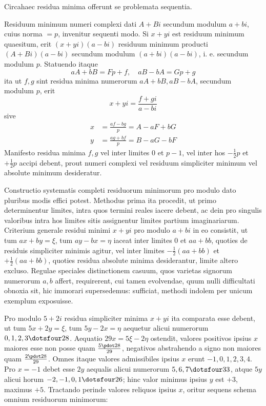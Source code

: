 Circa\textperiodcentered haec residua minima offerunt se problemata sequentia.

Residuum minimum numeri complexi dati $A+Bi$ secundum modulum $a+bi$, cuius norma $=p$, invenitur sequenti modo. Si $x+yi$ est residuum minimum quaesitum, erit $(x+yi)(a-bi)$ residuum minimum producti $(A+Bi)(a-bi)$ secundum modulum $(a+bi)(a-bi)$, i. e. secundum modulum $p$. Statuendo itaque
\[
aA+bB=Fp+f,\quad aB-bA=Gp+g
\]
ita ut $f,g$ sint residua minima numerorum $aA+bB,aB-bA$, secundum modulum $p$, erit
%
\[
x+yi=\frac{f+gi}{a-bi}
\]
sive
\[
\begin{aligned}
x&=\frac{af-bg}{p}=A-aF+bG\\
y&=\frac{ag+bf}{p}=B-aG-bF
\end{aligned}
\]
Manifesto residua minima $f,g$ vel inter limites $0$ et $p-1$, vel inter hos $-\frac12p$ et $+\frac12p$ accipi debent, prout numeri complexi vel residuum simpliciter minimum vel absolute minimum desideratur.

Constructio systematis completi residuorum minimorum pro modulo dato pluribus modis effici potest. Methodus prima ita procedit, ut primo determinentur limites, intra quos termini reales iacere debent, ac dein pro singulis valoribus intra hos limites sitis assignentur limites partium imaginariarum. Criterium generale residui minimi $x+yi$ pro modulo $a+bi$ in eo consistit, ut tum $ax+by=\xi$, tum $ay-bx=\eta$ iaceat inter limites $0$ et $aa+bb$, quoties de residuis simpliciter minimis agitur, vel inter limites $-\frac12(aa+bb)$ et $+\frac12(aa+bb)$, quoties residua absolute minima desiderantur, limite altero excluso. Regulae speciales distinctionem casuum, quos varietas signorum numerorum $a,b$ affert, requirerent, cui tamen evolvendae, quum nulli difficultati obnoxia sit, hic immorari supersedemus: sufficiat, methodi indolem per unicum exemplum exposuisse.

Pro modulo $5+2i$ residua simpliciter minima $x+yi$ ita comparata esse debent, ut tum $5x+2y=\xi$, tum $5y-2x=\eta$ aequetur alicui numerorum $0,1,2,3\dotsfour28$. Aequatio $29x=5\xi-2\eta$ ostendit, valores positivos ipsius $x$ maiores esse non posse quam $\frac{5\pdot28}{29}$, negativos abstrahendo a signo non maiores quam $\frac{2\pdot28}{29}$. Omnes itaque valores admissibiles ipsius $x$ erunt $-1,0,1,2,3,4$. Pro $x=-1$ debet esse $2y$ aequalis alicui numerorum $5,6,7\dotsfour33$, atque $5y$ alicui horum $-2,-1,0,1\dotsfour26$; hinc valor minimus ipsius $y$ est $+3$, maximus $+5$. Tractando perinde valores reliquos ipsius $x$, oritur sequens schema omnium residuorum minimorum:

